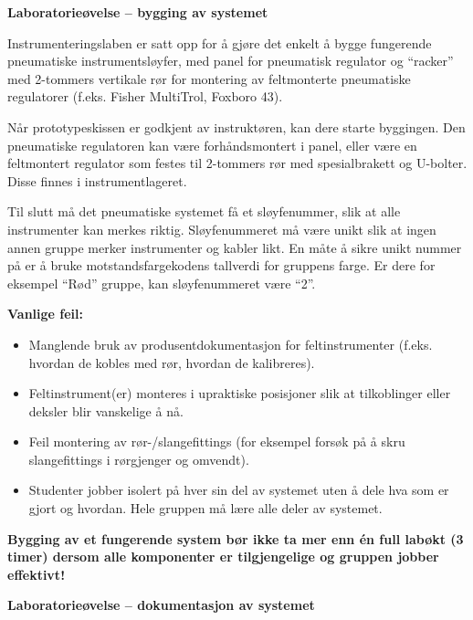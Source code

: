 \vfil \eject

\noindent
{\bf Laboratorieøvelse -- bygging av systemet}

\vskip 5pt

Instrumenteringslaben er satt opp for å gjøre det enkelt å bygge fungerende pneumatiske instrumentsløyfer, med panel for pneumatisk regulator og ``racker'' med 2-tommers vertikale rør for montering av feltmonterte pneumatiske regulatorer (f.eks. Fisher MultiTrol, Foxboro 43).

Når prototypeskissen er godkjent av instruktøren, kan dere starte byggingen. Den pneumatiske regulatoren kan være forhåndsmontert i panel, eller være en feltmontert regulator som festes til 2-tommers rør med spesialbrakett og U-bolter. Disse finnes i instrumentlageret.

Til slutt må det pneumatiske systemet få et sløyfenummer, slik at alle instrumenter kan merkes riktig. Sløyfenummeret må være unikt slik at ingen annen gruppe merker instrumenter og kabler likt. En måte å sikre unikt nummer på er å bruke motstandsfargekodens tallverdi for gruppens farge. Er dere for eksempel ``Rød'' gruppe, kan sløyfenummeret være ``2''.

\vskip 10pt

{\bf Vanlige feil:}

\begin{itemize}
\item{} Manglende bruk av produsentdokumentasjon for feltinstrumenter (f.eks. hvordan de kobles med rør, hvordan de kalibreres).
\item{} Feltinstrument(er) monteres i upraktiske posisjoner slik at tilkoblinger eller deksler blir vanskelige å nå.
\item{} Feil montering av rør-/slangefittings (for eksempel forsøk på å skru slangefittings i rørgjenger og omvendt).
\item{} Studenter jobber isolert på hver sin del av systemet uten å dele hva som er gjort og hvordan. Hele gruppen må lære alle deler av systemet.
\end{itemize}

\vskip 10pt

{\bf Bygging av et fungerende system bør ikke ta mer enn én full labøkt (3 timer) dersom alle komponenter er tilgjengelige og gruppen jobber effektivt!}




\vfil \eject

\noindent
{\bf Laboratorieøvelse -- dokumentasjon av systemet}

